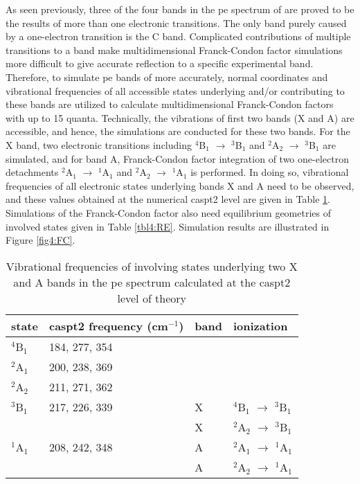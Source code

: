 \begin{refsection}
As seen previously, three of the four bands in the \acrshort{pe} spectrum of  are proved to be the results of more than one electronic transitions. The only band purely caused by a one-electron transition is the C band. Complicated contributions of multiple transitions to a band make multidimensional Franck-Condon factor simulations more difficult to give accurate reflection to a specific experimental band. Therefore, to simulate \acrshort{pe} bands of  more accurately, normal coordinates and vibrational frequencies of all accessible states underlying and/or contributing to these bands are utilized to calculate multidimensional Franck-Condon factors with up to 15 quanta. Technically, the vibrations of first two bands (X and A) are accessible, and hence, the simulations are conducted for these two bands. For the X band, two electronic transitions including $^4$B$_1$ $\longrightarrow$ $^3$B$_1$ and $^2$A$_2$ $\longrightarrow$ $^3$B$_1$ are simulated, and for band A, Franck-Condon factor integration of two one-electron detachments $^2$A$_1$ $\longrightarrow$ $^1$A$_1$ and $^2$A$_2$ $\longrightarrow$ $^1$A$_1$ is performed. In doing so, vibrational frequencies of all electronic states underlying bands X and A need to be observed, and these values obtained at the numerical \acrshort{caspt2} level are given in Table \ref{tbl4:feq}. Simulations of the Franck-Condon factor also need equilibrium geometries of involved states given in Table \ref{tbl4:RE}. Simulation results are illustrated in Figure \ref{fig4:FC}.






\begin{table}[htbp!]
	\centering
	\caption{Vibrational frequencies of involving states underlying two X and A bands in the \acrshort{pe} spectrum calculated at the \acrshort{caspt2} level of theory}
	\label{tbl4:feq}
	\begin{tabular}{@{}llll@{}}
	\toprule
	state & \acrshort{caspt2} frequency (cm$^{-1}$) & band & ionization \\ \midrule
	$^4$B$_1$   & 184, 277, 354           &      &            \\
	$^2$A$_1$   & 200, 238, 369           &      &            \\
	$^2$A$_2$   & 211, 271, 362           &      &            \\
	$^3$B$_1$   & 217, 226, 339           & X    & $^4$B$_1$ $\longrightarrow$ $^3$B$_1$  \\
		    &                             & X    & $^2$A$_2$ $\longrightarrow$ $^3$B$_1$  \\
	$^1$A$_1$   & 208, 242, 348           & A    & $^2$A$_1$ $\longrightarrow$ $^1$A$_1$  \\
		    &                             & A    & $^2$A$_2$ $\longrightarrow$ $^1$A$_1$  \\ \bottomrule
	\end{tabular}
	\end{table}







\end{refsection}
